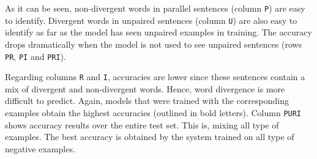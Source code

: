 \documentclass[11pt,a4paper]{article}
\begin{document}
As it can be seen, non-divergent words in parallel sentences (column \texttt{P}) are easy to identify. 
Divergent words in unpaired sentences (column \texttt{U}) are also easy to identify as far as the model has seen unpaired examples in training. 
The accuracy drops dramatically when the model is not used to see unpaired sentences (rows  \texttt{PR}, \texttt{PI} and \texttt{PRI}).

Regarding columns \texttt{R} and \texttt{I}, accuracies are lower since these sentences contain a mix of divergent and non-divergent words. 
Hence, word divergence is more difficult to predict. 
Again, models that were trained with the corresponding examples obtain the highest accuracies (outlined in bold letters).
Column \texttt{PURI} shows accuracy results over the entire test set. This is, mixing all type of examples. 
The best accuracy is obtained by the system trained on all type of negative examples. 

\end{document}
